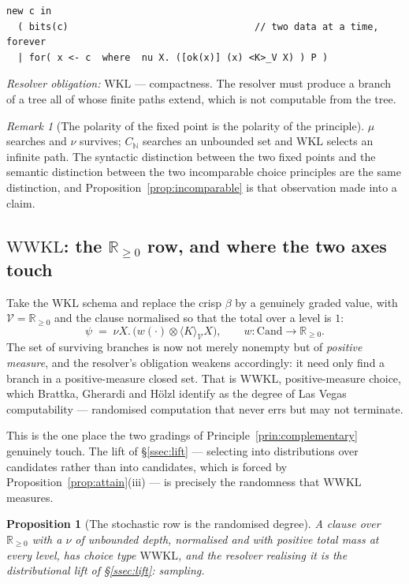 \documentclass[11pt]{article}
\theoremstyle{definition}
\theoremstyle{plain}
\newtheorem{proposition}{Proposition}
\theoremstyle{remark}
\newtheorem{remark}{Remark}
\newcommand{\V}{\mathcal{V}}
\newcommand{\tensorv}{\otimes}
\newcommand{\Rnn}{\mathbb{R}_{\geq 0}}
\newcommand{\Cand}{\mathrm{Cand}}
\newcommand{\WKL}{\mathrm{WKL}}
\newcommand{\WWKL}{\mathrm{WWKL}}
\begin{document}
\begin{lstlisting}
new c in
  ( bits(c)                                 // two data at a time, forever
  | for( x <- c  where  nu X. ([ok(x)] (x) <K>_V X) ) P )
\end{lstlisting}

\emph{Resolver obligation:} $\WKL$ --- compactness. The resolver must produce a branch
of a tree all of whose finite paths extend, which is not computable from the tree.

\begin{remark}[The polarity of the fixed point is the polarity of the principle]
$\mu$ searches and $\nu$ survives; $C_{\mathbb{N}}$ searches an unbounded set and
$\WKL$ selects an infinite path. The syntactic distinction between the two fixed
points and the semantic distinction between the two incomparable choice principles are
the same distinction, and Proposition~\ref{prop:incomparable} is that observation made
into a claim.
\end{remark}

\subsection{$\WWKL$: the $\Rnn$ row, and where the two axes touch}\label{ssec:wwkl}

Take the $\WKL$ schema and replace the crisp $\beta$ by a genuinely graded value, with
$\V = \Rnn$ and the clause normalised so that the total over a level is $1$:
\[
  \psi \;=\; \nu X.\, \big( w(\cdot) \tensorv \langle K \rangle_\V X \big),
  \qquad w : \Cand \to \Rnn .
\]
The set of surviving branches is now not merely nonempty but of \emph{positive
measure}, and the resolver's obligation weakens accordingly: it need only find a branch
in a positive-measure closed set. That is $\WWKL$, positive-measure choice, which
Brattka, Gherardi and H\"olzl identify as the degree of Las Vegas computability
\cite{brattkalasvegas} --- randomised computation that never errs but may not
terminate.

This is the one place the two gradings of Principle~\ref{prin:complementary} genuinely
touch. The lift of \S\ref{ssec:lift} --- selecting into distributions over candidates
rather than into candidates, which is forced by Proposition~\ref{prop:attain}(iii) ---
is precisely the randomness that $\WWKL$ measures.

\begin{proposition}[The stochastic row is the randomised degree]\label{prop:wwkl}
A clause over $\Rnn$ with a $\nu$ of unbounded depth, normalised and with positive
total mass at every level, has choice type $\WWKL$, and the resolver realising it is
the distributional lift of \S\ref{ssec:lift}: sampling.
\end{proposition}
\end{document}
